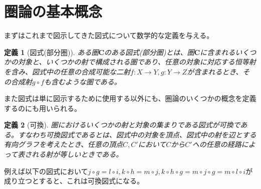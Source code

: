 \documentclass[dvipdfmx]{jsarticle}
\newcommand{\cat}[1]{\boldsymbol{#1}}
\newcommand{\arrow}{\rightarrow}
\newcommand{\mor}[3]{#1:#2\arrow #3}
\newtheorem{define}{定義}[section]
\begin{document}


	\section{圏論の基本概念}
	まずはこれまで図示してきた図式について数学的な定義を与える。
	\begin{define}[図式(部分圏)]
		ある圏$\cat{C}$のある図式(部分圏)とは、圏$\cat{C}$に含まれるいくつかの対象と、いくつかの射で構成される圏であり、任意の対象に対応する恒等射を含み、図式中の任意の合成可能な二射$\mor{f}{X}{Y},\mor{g}{Y}{Z}$が含まれるとき、その合成射$g\circ f$も含むような圏である。
	\end{define}
	また図式は単に図示するために使用する以外にも、圏論のいくつかの概念を定義するのにも用いられる。
	\begin{define}[可換]
		圏におけるいくつかの射と対象の集まりである図式が可換である。すなわち可換図式であるとは、図式中の対象を頂点、図式中の射を辺とする有向グラフを考えたとき、任意の頂点$C,C'$において$C$から$C'$への任意の経路によって表される射が等しいときである。
	\end{define}
	例えば以下の図式において$j\circ g=l\circ i,k\circ h=m\circ j,k\circ h\circ g=m\circ j\circ g = m\circ l\circ i$が成り立つとすると、これは可換図式になる。
\end{document}
